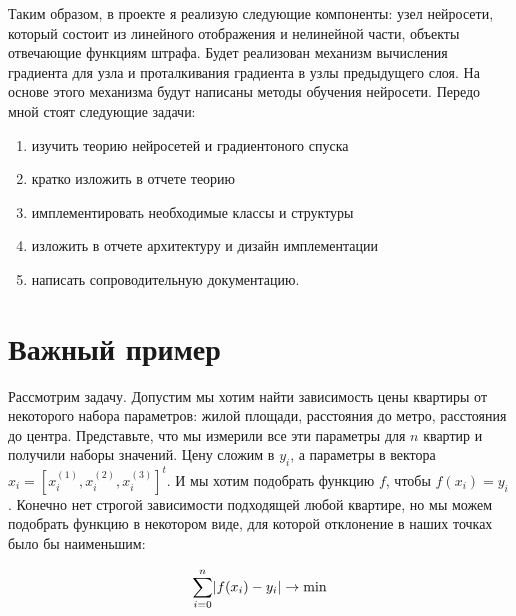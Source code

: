\documentclass{article}
\begin{document}
Таким образом, в проекте я реализую следующие компоненты: узел нейросети, который состоит из линейного отображения и нелинейной части, объекты отвечающие функциям штрафа. Будет реализован механизм вычисления градиента для узла и проталкивания градиента в узлы предыдущего слоя. На основе этого механизма будут написаны методы обучения нейросети. Передо мной стоят следующие задачи:
\begin{enumerate}
    \item изучить теорию нейросетей и градиентоного спуска
    \item кратко изложить в отчете теорию
    \item имплементировать необходимые классы и структуры
    \item изложить в отчете архитектуру и дизайн имплементации
    \item написать сопроводительную документацию.
\end{enumerate}

\section{Важный пример}

Рассмотрим задачу. Допустим мы хотим найти зависимость цены квартиры от некоторого набора параметров: жилой площади, расстояния до метро, расстояния до центра. Представьте, что мы измерили все эти параметры для $n$ квартир и получили наборы значений. Цену сложим в $y_i$, а параметры в вектора
$x_i =[x_i^{(1)}, x_i^{(2)}, x_i^{(3)}]^t$. И мы хотим подобрать функцию $f$, чтобы $f(x_i) = y_i$. Конечно нет строгой зависимости подходящей любой квартире, но мы можем подобрать функцию в некотором виде, для которой отклонение в наших точках было бы наименьшим:

$$
\Sum{i = 0}{n} |f(x_i) - y_i| \rightarrow \min
$$

\end{document}
